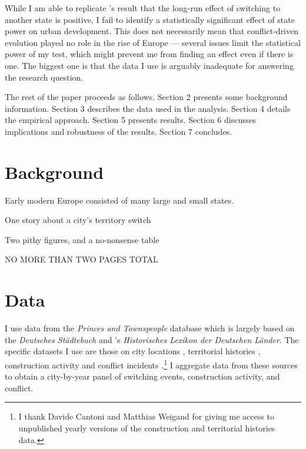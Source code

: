 \documentclass[11pt, a4paper]{article}
\begin{document}
While I am able to replicate \cite{schoenholzer2022}'s result that the long-run effect of switching to another state is positive, I fail to identify a statistically significant effect of state power on urban development. This does not necessarily mean that conflict-driven evolution played no role in the rise of Europe --- several issues limit the statistical power of my test, which might prevent me from finding an effect even if there is one. The biggest one is that the data I use is arguably inadequate for answering the research question.

The rest of the paper proceeds as follows. Section 2 presents some background information. Section 3 describes the data used in the analysis. Section 4 details the empirical approach. Section 5 presents results. Section 6 discusses implications and robustness of the results. Section 7 concludes.


\section{Background}

Early modern Europe consisted of many large and small states. 

One story about a city's territory switch

Two pithy figures, and a no-nonsense table

NO MORE THAN TWO PAGES TOTAL


\section{Data}

I use data from the \textit{Princes and Townspeople} database which is largely based on the \textit{Deutsches Städtebuch} \citep{keyser1939} and \cite{kobler2007}'s \textit{Historisches Lexikon der Deutschen Länder}. The specific datasets I use are those on city locations \citep{pt1}, territorial histories \citep{pt2}, construction activity \citep{pt5} and conflict incidents \citep{pt6}.\footnote{I thank Davide Cantoni and Matthias Weigand for giving me access to unpublished yearly versions of the construction and territorial histories data.} I aggregate data from these sources to obtain a city-by-year panel of switching events, construction activity, and conflict. 
\end{document}
